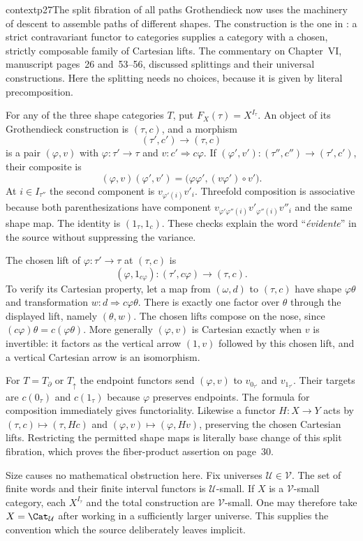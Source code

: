 \begin{dcomment}{context}{p27}{The split fibration of all paths}
Grothendieck now uses the machinery of descent to assemble paths of different shapes. The construction is the one in \citet[Expos\'e~VI, \S\S8--9]{GrothendieckSGA1}: a strict contravariant functor to categories supplies a category with a chosen, strictly composable family of Cartesian lifts. The commentary on Chapter~VI, manuscript pages~26 and~53--56, discussed splittings and their universal constructions. Here the splitting needs no choices, because it is given by literal precomposition.

For any of the three shape categories $T$, put $F_X(\tau)=X^{I_\tau}$. An object of its Grothendieck construction is $(\tau,c)$, and a morphism
\[
 (\tau',c')\longrightarrow(\tau,c)
\]
is a pair $(\varphi,v)$ with $\varphi:\tau'\to\tau$ and $v:c'\Rightarrow c\varphi$. If $(\varphi',v'):(\tau'',c'')\to(\tau',c')$, their composite is
\[
 (\varphi,v)(\varphi',v')=
 \bigl(\varphi\varphi',(v\varphi')\circ v'\bigr).
\]
At $i\in I_{\tau''}$ the second component is $v_{\varphi'(i)}v'_i$. Threefold composition is associative because both parenthesizations have component $v_{\varphi'\varphi''(i)}v'_{\varphi''(i)}v''_i$ and the same shape map. The identity is $(1_\tau,1_c)$. These checks explain the word ``\emph{\'evidente}'' in the source without suppressing the variance.

The chosen lift of $\varphi:\tau'\to\tau$ at $(\tau,c)$ is
\[
 (\varphi,1_{c\varphi}):(\tau',c\varphi)\longrightarrow(\tau,c).
\]
To verify its Cartesian property, let a map from $(\omega,d)$ to $(\tau,c)$ have shape $\varphi\theta$ and transformation $w:d\Rightarrow c\varphi\theta$. There is exactly one factor over $\theta$ through the displayed lift, namely $(\theta,w)$. The chosen lifts compose on the nose, since $(c\varphi)\theta=c(\varphi\theta)$. More generally $(\varphi,v)$ is Cartesian exactly when $v$ is invertible: it factors as the vertical arrow $(1,v)$ followed by this chosen lift, and a vertical Cartesian arrow is an isomorphism.

For $T=T_{\partial}$ or $T_{\uparrow}$ the endpoint functors send $(\varphi,v)$ to $v_{0_{\tau'}}$ and $v_{1_{\tau'}}$. Their targets are $c(0_\tau)$ and $c(1_\tau)$ because $\varphi$ preserves endpoints. The formula for composition immediately gives functoriality. Likewise a functor $H:X\to Y$ acts by $(\tau,c)\mapsto(\tau,Hc)$ and $(\varphi,v)\mapsto(\varphi,Hv)$, preserving the chosen Cartesian lifts. Restricting the permitted shape maps is literally base change of this split fibration, which proves the fiber-product assertion on page~30.

Size causes no mathematical obstruction here. Fix universes $\mathcal U\in\mathcal V$. The set of finite words and their finite interval functors is $\mathcal U$-small. If $X$ is a $\mathcal V$-small category, each $X^{I_\tau}$ and the total construction are $\mathcal V$-small. One may therefore take $X=\Cat_{\mathcal U}$ after working in a sufficiently larger universe. This supplies the convention which the source deliberately leaves implicit.
\end{dcomment}

